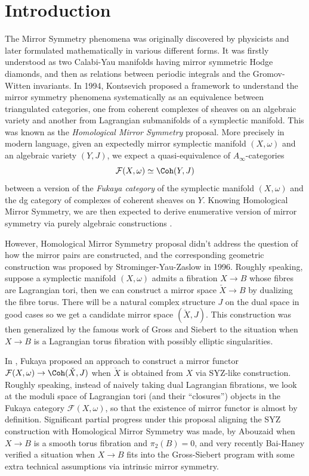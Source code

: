 \section{Introduction}
The Mirror Symmetry phenomena was originally discovered by physicists and later formulated mathematically in various different forms. It was firstly understood as two Calabi-Yau manifolds having mirror symmetric Hodge diamonds, and then as relations between periodic integrals and the Gromov-Witten invariants. In 1994, Kontsevich \cite{Kontsevich95} proposed a framework to understand the mirror symmetry phenomena systematically as an equivalence between triangulated categories, one from coherent complexes of sheaves on an algebraic variety and another from Lagrangian submanifolds of a symplectic manifold. This was known as the \emph{Homological Mirror Symmetry} proposal. More precisely in modern language, given an expectedly mirror symplectic manifold $(X,\omega)$ and an algebraic variety $(Y,J)$, we expect a quasi-equivalence of $A_{\infty}$-categories \[
    \mathcal{F} (X,\omega)\simeq\Coh (Y,J)
\]between a version of the \emph{Fukaya category} of the symplectic manifold $(X,\omega)$ and the dg category of complexes of coherent sheaves on $Y$. Knowing Homological Mirror Symmetry, we are then expected to derive enumerative version of mirror symmetry via purely algebraic constructions \cite{KKP08}.\par
However, Homological Mirror Symmetry proposal didn't address the question of how the mirror pairs are constructed, and the corresponding geometric construction was proposed by Strominger-Yau-Zaslow \cite{SYZ96} in 1996. Roughly speaking, suppose a symplectic manifold $(X,\omega)$ admits a fibration $X\to B$ whose fibres are Lagrangian tori, then we can construct a mirror space $\check{X}\to B$ by dualizing the fibre torus. There will be a natural complex structure $J$ on the dual space in good cases so we get a candidate mirror space $(\check{X},J)$. This construction was then generalized by the famous work of Gross and Siebert \cite{GS06,GS10,GS26} to the situation when $X\to B$ is a Lagrangian torus fibration with possibly elliptic singularities.\par 
In \cite{Fukaya05}, Fukaya proposed an approach to construct a mirror functor $\mathcal{F} (X,\omega)\to\Coh (\check{X},J)$ when $\check{X}$ is obtained from $X$ via SYZ-like construction. Roughly speaking, instead of naively taking dual Lagrangian fibrations, we look at the moduli space of Lagrangian tori (and their ``closures'') objects in the Fukaya category $\mathcal{F} (X,\omega)$, so that the existence of mirror functor is almost by definition. Significant partial progress under this proposal aligning the SYZ construction with Homological Mirror Symmetry was made, by Abouzaid \cite{Abouzaid21} when $X\to B$ is a smooth torus fibration and $\pi_2(B)=0$, and very recently Bai-Haney \cite{BH26} verified a situation when $X\to B$ fits into the Gross-Siebert program with some extra technical assumptions via intrinsic mirror symmetry.\par
